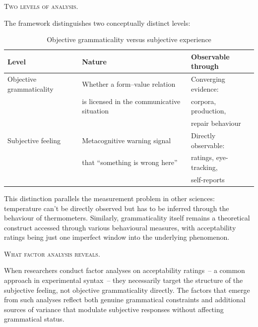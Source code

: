 \documentclass[12pt,letterpaper]{article}
\begin{document}
\textsc{Two levels of analysis.}

The framework distinguishes two conceptually distinct levels:

\begin{table}[h]
\centering
\caption{Objective grammaticality versus subjective experience}
\label{tab:two-levels}
\begin{tabular}{@{}lll@{}}
\toprule
Level & Nature & Observable through\\
\midrule
Objective grammaticality & Whether a form--value relation & Converging evidence:\\
& is licensed in the communicative situation & corpora, production,\\
& & repair behaviour\\[6pt]
Subjective feeling & Metacognitive warning signal & Directly observable:\\
& that \enquote{something is wrong here} & ratings, eye-tracking,\\
& & self-reports\\
\bottomrule
\end{tabular}
\end{table}

This distinction parallels the measurement problem in other sciences: temperature can't be directly observed but has to be inferred through the behaviour of thermometers. Similarly, grammaticality itself remains a theoretical construct accessed through various behavioural measures, with acceptability ratings being just one imperfect window into the underlying phenomenon.

\textsc{What factor analysis reveals.}

When researchers conduct factor analyses on acceptability ratings~-- a common approach in experimental syntax~-- they necessarily target the structure of the subjective feeling, not objective grammaticality directly. The factors that emerge from such analyses reflect both genuine grammatical constraints and additional sources of variance that modulate subjective responses without affecting grammatical status.
\end{document}

